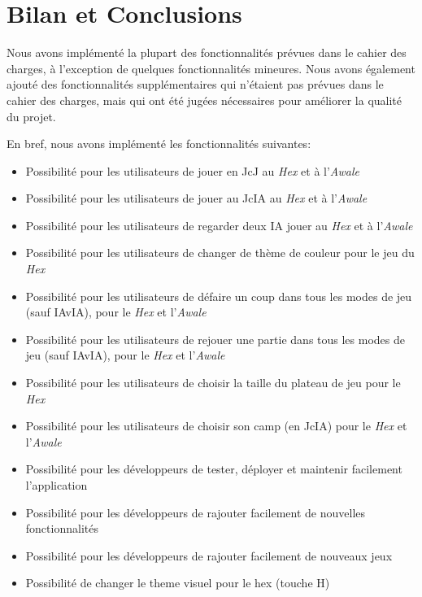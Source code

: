\section{Bilan et Conclusions}

Nous avons implémenté la plupart des fonctionnalités prévues dans le cahier des charges, à l'exception de quelques
fonctionnalités mineures. Nous avons également ajouté des fonctionnalités supplémentaires qui n'étaient pas prévues
dans le cahier des charges, mais qui ont été jugées nécessaires pour améliorer la qualité du projet.

En bref, nous avons implémenté les fonctionnalités suivantes:

\begin{itemize}
    \item Possibilité pour les utilisateurs de jouer en JcJ au \emph{Hex} et à l'\emph{Awale}
    \item Possibilité pour les utilisateurs de jouer au JcIA au \emph{Hex} et à l'\emph{Awale}
    \item Possibilité pour les utilisateurs de regarder deux IA jouer au \emph{Hex} et à l'\emph{Awale}
    \item Possibilité pour les utilisateurs de changer de thème de couleur pour le jeu du \emph{Hex}
    \item Possibilité pour les utilisateurs de défaire un coup dans tous les modes de jeu (sauf IAvIA), pour le \emph{Hex} et l'\emph{Awale}
    \item Possibilité pour les utilisateurs de rejouer une partie dans tous les modes de jeu (sauf IAvIA), pour le \emph{Hex} et l'\emph{Awale}
    \item Possibilité pour les utilisateurs de choisir la taille du plateau de jeu pour le \emph{Hex}
    \item Possibilité pour les utilisateurs de choisir son camp (en JcIA) pour le \emph{Hex} et l'\emph{Awale}
    \item Possibilité pour les développeurs de tester, déployer et maintenir facilement l'application
    \item Possibilité pour les développeurs de rajouter facilement de nouvelles fonctionnalités
    \item Possibilité pour les développeurs de rajouter facilement de nouveaux jeux
    \item Possibilité de changer le theme visuel pour le hex (touche H)
\end{itemize}

